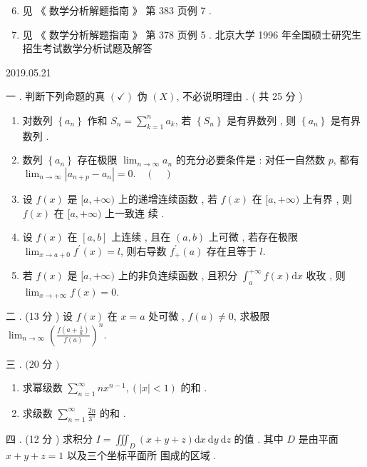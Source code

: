 \documentclass[10pt]{article}
\begin{document}
\begin{enumerate}
  \setcounter{enumi}{5}
  \item  见 《 数学分析解题指南 》 第  383  页例  7 .

  \item  见  《 数学分析解题指南 》 第  378  页例  5 .  北京大学  1996  年全国硕士研究生招生考试数学分析试题及解答 

\end{enumerate}
   

2019.05.21

 一 .  判断下列命题的真  $(\checkmark)$  伪  $(X)$,  不必说明理由 . ( 共  25  分 )

\begin{enumerate}
  \item  对数列  $\left\{a_{n}\right\}$  作和  $S_{n}=\sum_{k=1}^{n} a_{k}$,  若  $\left\{S_{n}\right\}$  是有界数列 ,  则  $\left\{a_{n}\right\}$  是有界数列 .

  \item  数列  $\left\{a_{n}\right\}$  存在极限  $\lim _{n \rightarrow \infty} a_{n}$  的充分必要条件是 :  对任一自然数  $p$,  都有  $\lim _{n \rightarrow \infty}\left|a_{n+p}-a_{n}\right|=0 . \quad(\quad)$

  \item  设  $f(x)$  是  $[a,+\infty)$  上的递增连续函数 ,  若  $f(x)$  在  $[a,+\infty)$  上有界 ,  则  $f(x)$  在  $[a,+\infty)$  上一致连   续 .

  \item  设  $f(x)$  在  $[a, b]$  上连续 ,  且在  $(a, b)$  上可微 ,  若存在极限  $\lim _{x \rightarrow a+0} f^{\prime}(x)=l$,  则右导数  $f_{+}^{\prime}(a)$  存在且等于  $l$.

  \item  若  $f(x)$  是  $[a,+\infty)$  上的非负连续函数 ,  且积分  $\int_{a}^{+\infty} f(x) \mathrm{d} x$  收玫 ,  则  $\lim _{x \rightarrow+\infty} f(x)=0$.

\end{enumerate}
 二 . (13  分 )  设  $f(x)$  在  $x=a$  处可微 , $f(a) \neq 0$,  求极限  $\lim _{n \rightarrow \infty}\left(\frac{f\left(a+\frac{1}{n}\right)}{f(a)}\right)^{n}$.

 三 . $(20$  分  $)$

\begin{enumerate}
  \item  求幂级数  $\sum_{n=1}^{\infty} n x^{n-1},(|x|<1)$  的和 .

  \item  求级数  $\sum_{n=1}^{\infty} \frac{2 n}{3^{n}}$  的和 .

\end{enumerate}
 四 . (12  分 )  求积分  $I=\iiint_{D}(x+y+z) \mathrm{d} x \mathrm{~d} y \mathrm{~d} z$  的值 .  其中  $D$  是由平面  $x+y+z=1$  以及三个坐标平面所   围成的区域 .
\end{document}
